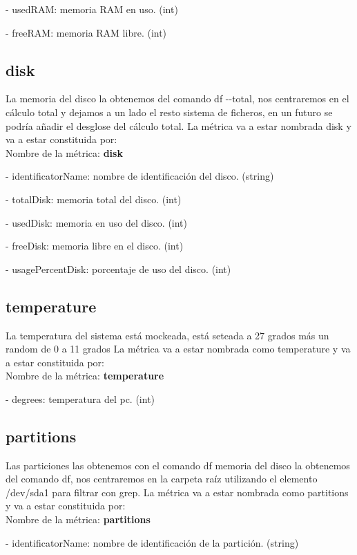 \documentclass[ spanish, a4paper, 12pt, oneside]{report}
\begin{document}
\hyp{} usedRAM: memoria RAM en uso. (int)

\hyp{} freeRAM: memoria RAM libre. (int)

\subsection{disk}
La memoria del disco la obtenemos del comando df \hyp{}\hyp{}total, nos centraremos en el cálculo total y dejamos a un lado el resto 
sistema de ficheros, en un futuro se podría añadir el desglose del cálculo total. La métrica va a estar nombrada disk
y va a estar constituida por:\\
 
Nombre de la métrica: \textbf{disk}

\hyp{} identificatorName: nombre de identificación del disco. (string)
 
\hyp{} totalDisk: memoria total del disco. (int)
 
\hyp{} usedDisk: memoria en uso del disco. (int)
 
\hyp{} freeDisk: memoria libre en el disco. (int)
 
\hyp{} usagePercentDisk: porcentaje de uso del disco. (int)

\subsection{temperature}
La temperatura del sistema está mockeada, está seteada a 27 grados más un random de 0 a 11 grados 
La métrica va a estar nombrada como temperature y va a estar constituida por:\\
  
Nombre de la métrica: \textbf{temperature}
 
\hyp{} degrees: temperatura del pc. (int)

\subsection{partitions}
Las particiones las obtenemos con el comando df memoria del disco la obtenemos del comando df, nos centraremos en la carpeta raíz utilizando 
el elemento /dev/sda1 para filtrar con grep. La métrica va a estar nombrada como partitions y va a estar constituida por:\\
   
Nombre de la métrica: \textbf{partitions}
  
\hyp{} identificatorName: nombre de identificación de la partición. (string)
\end{document}
